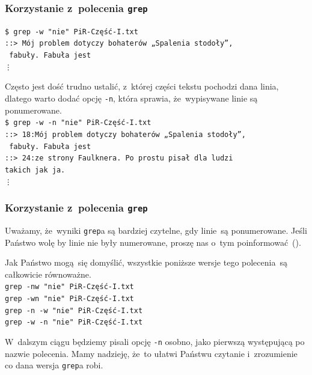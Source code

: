 \documentclass[10pt,t]{beamer}
\begin{document}
\begin{frame}
  \frametitle{Korzystanie z~polecenia \texttt{grep}}


  \texttt{\$ grep -w "nie"{} PiR-Część-I.txt} \\
  \texttt{::> Mój problem dotyczy bohaterów „Spalenia stodoły”,} \\
  \texttt{ fabuły. Fabuła jest} \\
  \hspace{2em} \texttt{\vdots}

  Często jest dość trudno ustalić, z~której części tekstu pochodzi dana
  linia, dlatego warto dodać opcję \texttt{-n}, która sprawia,
  że~wypisywane linie są ponumerowane. \\
  \texttt{\$ grep -w -n "nie"{} PiR-Część-I.txt} \\
  \texttt{::> 18:Mój problem dotyczy bohaterów „Spalenia stodoły”,} \\
  \texttt{ fabuły. Fabuła jest} \\
  \texttt{::> 24:ze strony Faulknera. Po prostu 
    pisał dla ludzi} \\
  \texttt{takich jak ja.} \\
  \hspace{2em} \texttt{\vdots}

\end{frame}





\begin{frame}
  \frametitle{Korzystanie z~polecenia \texttt{grep}}


  Uważamy, że~wyniki \texttt{grep}a są bardziej czytelne, gdy linie~są
  ponumerowane. Jeśli Państwo wolę by linie nie były numerowane, proszę
  nas o~tym poinformować~(\email).

  Jak Państwo mogą~się domyślić, wszystkie poniższe wersje tego
  polecenia~są całkowicie równoważne. \\
  \texttt{grep -nw "nie"{} PiR-Część-I.txt} \\
  \texttt{grep -wn "nie"{} PiR-Część-I.txt} \\
  \texttt{grep -n -w "nie"{} PiR-Część-I.txt} \\
  \texttt{grep -w -n "nie"{} PiR-Część-I.txt}

  W~dalszym ciągu będziemy pisali opcję \texttt{-n} osobno, jako
  pierwszą występującą po nazwie polecenia. Mamy nadzieję, że~to ułatwi
  Państwu czytanie i~zrozumienie co dana wersja \texttt{grep}a robi.

\end{frame}
\end{document}
